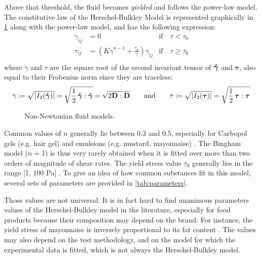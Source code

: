 \documentclass[11 pt]{report}
\begin{document}
Above that threshold, the fluid becomes \textit{yielded} and follows the power-law model. The constitutive law of the Herschel-Bulkley Model is represented graphically in \cref{fig:fluid-classification} along with the power-law model, and has the following expression: 
\begin{equation}
    \begin{aligned}
        \dot \gamma_{ij} &= 0 & \text{if} \quad \tau < \tau_0\\
        \tau_{ij} &= \left(K \dot \gamma^{n-1} + \frac{\tau_0}{\dot \gamma}\right) \gamma_{ij} & \text{if} \quad \tau \geq \tau_0\\
    \end{aligned}
    \label{eq:herschel}
\end{equation}
where $\dot \gamma$ and $\tau$ are the square root of the second invariant tensor of $\boldsymbol{\dot \gamma}$ and $\boldsymbol\tau$, also equal to their Frobenius norm since they are traceless:
\begin{equation}
    \dot \gamma \coloneqq \sqrt{|I_2(\boldsymbol{\dot \gamma})|} = \sqrt{\frac{1}{2} \, \boldsymbol{\dot \gamma} : \boldsymbol{\dot \gamma}} = \sqrt{2 \mathbf{D} : \mathbf{D}} \qquad\text{and}\qquad
    \tau \coloneqq \sqrt{|I_2(\boldsymbol\tau)|} = \sqrt{\frac{1}{2} \, \boldsymbol\tau : \boldsymbol\tau}
    \label{eq:tensornorm}
\end{equation}

\begin{figure}[!b]
    \centering
    
    \caption{Non-Newtonian fluid models.}
    \label{fig:fluid-classification}
\end{figure}

Common values of $n$ generally lie between $0.3$ and $0.5$, especially for Carbopol gels (e.g. hair gel) and emulsions (e.g. mustard, mayonnaise) \cite{Coussot}. The Bingham model ($n = 1$) is thus very rarely obtained when it is fitted over more than two orders of magnitude of shear rates. The yield stress value $\tau_0$ generally lies in the range [1, 100 Pa] \cite{Coussot}. To give an idea of how common substances fit in this model, several sets of parameters are provided in \cref{tab:parameters}.

Those values are not universal. It is in fact hard to find unanimous parameters values of the Herschel-Bulkley model in the literature, especially for food products because their composition may depend on the brand. For instance, the yield stress of mayonnaise is inversely proportional to its fat content \cite{mayonnaiseFat}. The values may also depend on the test methodology, and on the model for which the experimental data is fitted, which is not always the Herschel-Bulkley model.
\end{document}
